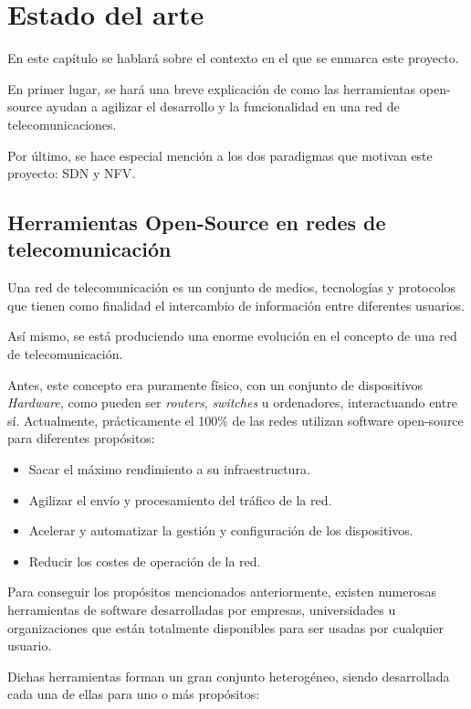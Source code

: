 \chapter{Estado del arte}
En este capítulo se hablará sobre el contexto en el que se enmarca este proyecto.

En primer lugar, se hará una breve explicación de como las herramientas open-source ayudan a agilizar el desarrollo y la funcionalidad en una red de telecomunicaciones.

Por último, se hace especial mención a los dos paradigmas que motivan este proyecto: SDN y NFV.

\section{Herramientas Open-Source en redes de telecomunicación}

Una red de telecomunicación es un conjunto de medios, tecnologías y protocolos que tienen como finalidad el intercambio de información entre diferentes usuarios.

Así mismo, se está produciendo una enorme evolución en el concepto de una red de telecomunicación. 

Antes, este concepto era puramente físico, con un conjunto de dispositivos \textit{Hardware}, como pueden ser \textit{routers}, \textit{switches} u ordenadores, interactuando entre sí. Actualmente, prácticamente el 100\% de las redes utilizan software open-source para diferentes propósitos:

\begin{itemize}
	\item Sacar el máximo rendimiento a su infraestructura.
	\item Agilizar el envío y procesamiento del tráfico de la red.
	\item Acelerar y automatizar la gestión y configuración de los dispositivos.
	\item Reducir los costes de operación de la red.
\end{itemize}

Para conseguir los propósitos mencionados anteriormente, existen numerosas herramientas de software desarrolladas por empresas, universidades u organizaciones que están totalmente disponibles para ser usadas por cualquier usuario.

Dichas herramientas forman un gran conjunto heterogéneo, siendo desarrollada cada una de ellas para uno o más propósitos:

